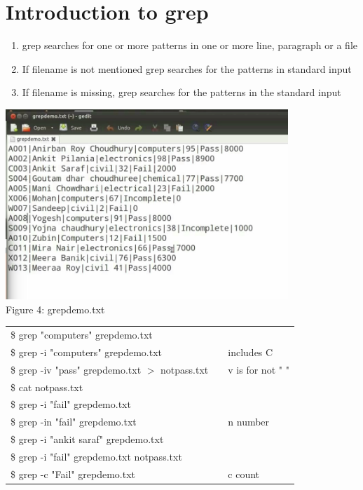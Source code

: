 \documentclass[12pt, a4paper]{report}
\begin{document}
\section{Introduction to grep}
\begin{enumerate}
\item grep searches for one or more patterns in one or more line, paragraph or a file
\item If filename is not mentioned grep searches for the patterns in standard input
\item If filename is missing, grep searches for the patterns in the standard input
\end{enumerate}
\includegraphics[width=0.8\textwidth]{15_grep.jpg}\\
Figure 4: grepdemo.txt\\
\begin{tabular}{|lcl|}\hline
\$ grep "computers" grepdemo.txt &&\\
\$ grep -i "computers" grepdemo.txt && includes C\\
\$ grep -iv "pass" grepdemo.txt $>$ notpass.txt && v is for not "   "\\
\$ cat notpass.txt &&\\
\$ grep -i "fail" grepdemo.txt &&\\
\$ grep -in "fail" grepdemo.txt && n number\\
\$ grep -i "ankit saraf" grepdemo.txt &&\\
\$ grep -i "fail" grepdemo.txt notpass.txt &&\\
\$ grep -c "Fail" grepdemo.txt && c count\\ \hline
\end{tabular}
\end{document}
